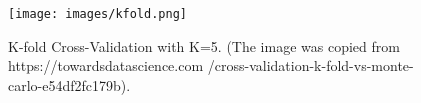 \begin{figure}[h]
\centering
\captionsetup{justification=centering}
\texttt{[image: images/kfold.png]}
\caption{K-fold Cross-Validation with K=5. (The image was copied from \\https://towardsdatascience.com /cross-validation-k-fold-vs-monte-carlo-e54df2fc179b).}
\label{imgKFold}
\end{figure}



